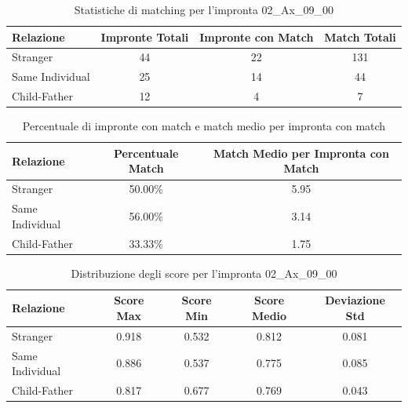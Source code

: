 \begin{table}[htbp]
\centering
\caption{Statistiche di matching per l'impronta 02\_Ax\_09\_00}
\label{tab:results_02_Ax_09_00}
\begin{tabular}{|l|c|c|c|}
\hline
\textbf{Relazione} & \textbf{Impronte Totali} & \textbf{Impronte con Match} & \textbf{Match Totali} \\
\hline
Stranger & 44 & 22 & 131 \\
\hline
Same Individual & 25 & 14 & 44 \\
\hline
Child-Father & 12 & 4 & 7 \\
\hline
\end{tabular}
\end{table}


\begin{table}[htbp]
\centering
\caption{Percentuale di impronte con match e match medio per impronta con match}
\label{tab:match_percentage_02_Ax_09_00}
\begin{tabular}{|l|c|c|}
\hline
\textbf{Relazione} & \textbf{Percentuale Match} & \textbf{Match Medio per Impronta con Match} \\
\hline
Stranger & 50.00\% & 5.95 \\
\hline
Same Individual & 56.00\% & 3.14 \\
\hline
Child-Father & 33.33\% & 1.75 \\
\hline
\end{tabular}
\end{table}


\begin{table}[htbp]
\centering
\caption{Distribuzione degli score per l'impronta 02\_Ax\_09\_00}
\label{tab:scores_02_Ax_09_00}
\begin{tabular}{|l|c|c|c|c|}
\hline
\textbf{Relazione} & \textbf{Score Max} & \textbf{Score Min} & \textbf{Score Medio} & \textbf{Deviazione Std} \\
\hline
Stranger & 0.918 & 0.532 & 0.812 & 0.081 \\
\hline
Same Individual & 0.886 & 0.537 & 0.775 & 0.085 \\
\hline
Child-Father & 0.817 & 0.677 & 0.769 & 0.043 \\
\hline
\end{tabular}
\end{table}

